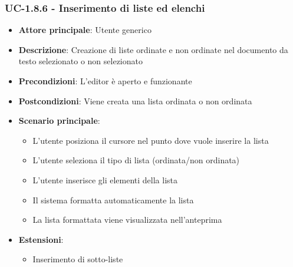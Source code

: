 \documentclass[11pt,a4paper]{article}
\begin{document}
\subsubsection{UC-1.8.6 - Inserimento di liste ed elenchi}
\begin{itemize}
    \item \textbf{Attore principale}: Utente generico
    \item \textbf{Descrizione}: Creazione di liste ordinate e non ordinate nel documento da testo selezionato o non selezionato
    \item \textbf{Precondizioni}: L'editor è aperto e funzionante
    \item \textbf{Postcondizioni}: Viene creata una lista ordinata o non ordinata
    \item \textbf{Scenario principale}:
        \begin{itemize}
            \item L'utente posiziona il cursore nel punto dove vuole inserire la lista
            \item L'utente seleziona il tipo di lista (ordinata/non ordinata)
            \item L'utente inserisce gli elementi della lista
            \item Il sistema formatta automaticamente la lista
            \item La lista formattata viene visualizzata nell'anteprima
        \end{itemize}
    \item \textbf{Estensioni}:
        \begin{itemize}
            \item Inserimento di sotto-liste
        \end{itemize}
\end{itemize}
\end{document}
